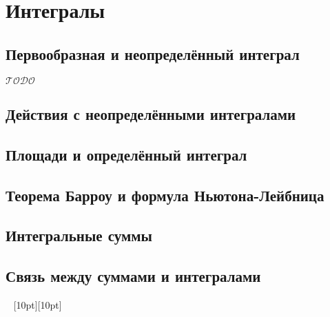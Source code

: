 \documentclass[a4paper,12pt]{article}
\numberwithin{figure}{section}
\theoremstyle{definition}
\theoremstyle{definition}
\def\todo {\guillemotleft$\mathcal{TODO}$\guillemotright\textellipsis}
\def\vignette {\vspace{48pt} \noindent \hrulefill~ \raisebox{-8pt}[10pt][10pt]{\Huge\ding{102}}~ \hrulefill}
\begin{document}
\section{Интегралы}


\subsection{Первообразная и неопределённый интеграл}

\todo


\subsection{Действия с неопределёнными интегралами}


\subsection{Площади и определённый интеграл}


\subsection{Теорема Барроу и формула Ньютона-Лейбница}


\subsection{Интегральные суммы}


\subsection{Связь между суммами и интегралами}

\vignette
\end{document}
